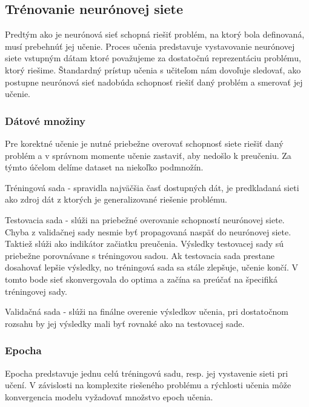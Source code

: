 \subsection{Trénovanie neurónovej siete}

Predtým ako je neurónová sieť schopná riešiť problém, na ktorý bola definovaná, musí prebehnúť jej učenie. Proces učenia predstavuje vystavovanie neurónovej siete vstupným dátam ktoré považujeme za dostatočnú reprezentáciu problému, ktorý riešime. Štandardný prístup učenia s učiteľom nám dovoľuje sledovať, ako postupne neurónová sieť nadobúda schopnosť riešiť daný problém a smerovať jej učenie.
\subsubsection*{Dátové množiny}

Pre korektné učenie je nutné priebežne overovať schopnosť siete riešiť daný problém a v správnom momente učenie zastaviť, aby nedošlo k preučeniu. Za týmto účelom delíme dataset na niekoľko podmnožín.

\begin{my_itemize}
	\item {Tréningová sada} - spravidla najväčšia časť dostupných dát, je predkladaná sieti ako zdroj dát z ktorých je generalizované riešenie problému.
	\item {Testovacia sada} - slúži na priebežné overovanie schopností neurónovej siete. Chyba z validačnej sady nesmie byť propagovaná naspäť do neurónovej siete. Taktiež slúži ako indikátor začiatku preučenia. Výsledky testovacej sady sú priebežne porovnávane s tréningovou sadou. Ak testovacia sada prestane dosahovať lepšie výsledky, no tréningová sada sa stále zlepšuje, učenie končí. V tomto bode sieť skonvergovala do optima a začína sa preúčať na špecifiká tréningovej sady.
	\item {Validačná sada} - slúži na finálne overenie výsledkov učenia, pri dostatočnom rozsahu by jej výsledky mali byť rovnaké ako na testovacej sade. 
\end{my_itemize}

\subsubsection*{Epocha}

Epocha predstavuje jednu celú tréningovú sadu, resp. jej vystavenie sieti pri učení. V závislosti na komplexite riešeného problému a rýchlosti učenia môže konvergencia modelu vyžadovať množstvo epoch učenia.

